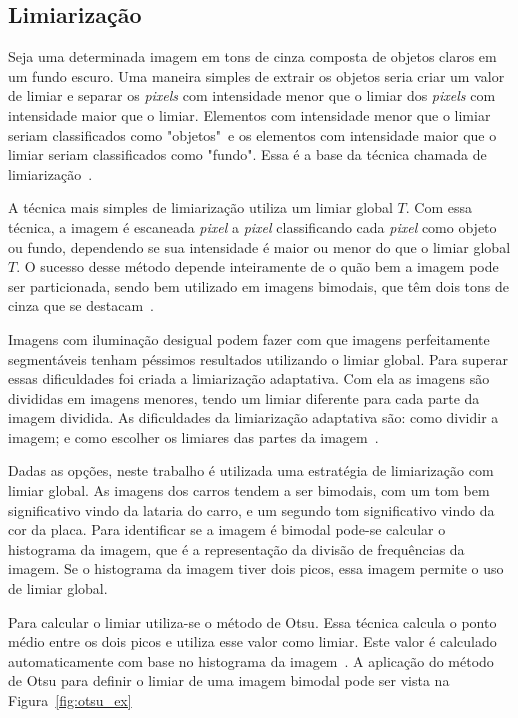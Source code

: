 \subsection{Limiarização}
\label{sec:limiarizacao}

Seja uma determinada imagem em tons de cinza composta de objetos claros em um
fundo escuro. Uma maneira simples de extrair os objetos seria criar um valor de
limiar e separar os \emph{pixels} com intensidade menor que o limiar dos
\emph{pixels} com intensidade maior que o limiar. Elementos com intensidade
menor que o limiar seriam classificados como "objetos"~e os elementos com
intensidade maior que o limiar seriam classificados como "fundo". Essa é a base
da técnica chamada de limiarização~\cite{gonzalez1977digital}.

A técnica mais simples de limiarização utiliza um limiar global $T$. Com essa
técnica, a imagem é escaneada \emph{pixel} a \emph{pixel} classificando cada
\emph{pixel} como objeto ou fundo, dependendo se sua intensidade é maior ou
menor do que o limiar global $T$. O sucesso desse método depende inteiramente de
o quão bem a imagem pode ser particionada, sendo bem utilizado em imagens
bimodais, que têm dois tons de cinza que se destacam~\cite{gonzalez1977digital}.

Imagens com iluminação desigual podem fazer com que imagens perfeitamente
segmentáveis tenham péssimos resultados utilizando o limiar global. Para superar
essas dificuldades foi criada a limiarização adaptativa. Com ela as imagens são
divididas em imagens menores, tendo um limiar diferente para cada parte da
imagem dividida. As dificuldades da limiarização adaptativa são: como dividir a
imagem; e como escolher os limiares das partes da
imagem~\cite{gonzalez1977digital}.

Dadas as opções, neste trabalho é utilizada uma estratégia de limiarização com
limiar global. As imagens dos carros tendem a ser bimodais, com um tom bem
significativo vindo da lataria do carro, e um segundo tom significativo vindo da
cor da placa. Para identificar se a imagem é bimodal pode-se calcular o
histograma da imagem, que é a representação da divisão de frequências da imagem.
Se o histograma da imagem tiver dois picos, essa imagem permite o uso de limiar
global.

Para calcular o limiar utiliza-se o método de Otsu. Essa técnica calcula o ponto
médio entre os dois picos e utiliza esse valor como limiar. Este valor é
calculado automaticamente com base no histograma da
imagem~\cite{opencv2014thresh}. A aplicação do método de Otsu para definir o
limiar de uma imagem bimodal pode ser vista na Figura~\ref{fig:otsu_ex}

